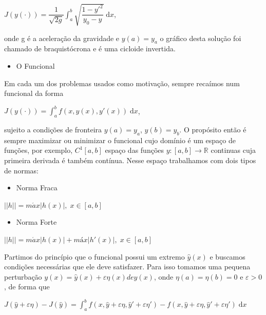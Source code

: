 \documentclass[12pt, a4paper]{article}
\begin{document}
\begin{center}
$J(y(\cdot)) = \dfrac{1}{\sqrt{2g}} \int_a^b \sqrt{\dfrac{1-y'^2}{y_0 - y}}\; \mathrm{d}x$,
\end{center}

onde g é a aceleração da gravidade e $y(a) = y_a$  o gráfico desta solução foi chamado de braquistócrona e é uma cicloide invertida.

\begin{itemize}
\item O Funcional
\end{itemize}

Em cada um dos problemas usados como motivação, sempre recaímos num funcional da forma

\begin{center}
$J(y(\cdot)) = \int_a^b f(x, y(x), y'(x)) \; \mathrm{d}x$,
\end{center}

sujeito a condições de fronteira $y(a) = y_a$, $y(b) = y_b$.
O propósito então é sempre maximizar ou minimizar o funcional cujo domínio é um espaço de funções, por exemplo, $C^1[a,b]$ espaço das funções $y:[a,b] \to \mathbb{R}$ continuas cuja primeira derivada é também contínua. Nesse espaço trabalhamos com dois tipos de normas:

\begin{itemize}
\item Norma Fraca
\end{itemize}

\begin{center}
$ ||h|| = m\acute{a}x|h(x)|, \; x \in [a,b] $
\end{center}

\begin{itemize}
\item Norma Forte
\end{itemize}

\begin{center}
$ ||h|| = m\acute{a}x|h(x)| + máx|h'(x)|, \;x \in [a,b] $
\end{center}

Partimos do princípio que o funcional possui um extremo $\hat{y}(x)$ e buscamos condições necessárias que ele deve satisfazer. Para isso tomamos uma pequena perturbação 
$y(x)= \hat{y}(x)+ \varepsilon\eta(x) de \hat{y}(x)$, onde $\eta(a)= \eta(b)=0$ e $\varepsilon>0$, de forma que 

\begin{center}
$J(\hat{y} + \varepsilon\eta) - J(\hat{y}) = \int_a^b f(x, \hat{y} + \varepsilon\eta, \hat{y}' + \varepsilon\eta') - f(x, \hat{y} + \varepsilon\eta, \hat{y}' + \varepsilon\eta') \; \mathrm{d}x $
\end{center}
\end{document}
